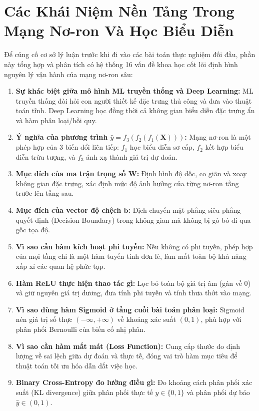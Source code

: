 \documentclass[12pt,a4paper]{report}
\begin{document}
\section{Các Khái Niệm Nền Tảng Trong Mạng Nơ-ron Và Học Biểu Diễn}
Để củng cố cơ sở lý luận trước khi đi vào các bài toán thực nghiệm đối đầu, phần này tổng hợp và phân tích có hệ thống 16 vấn đề khoa học cốt lõi định hình nguyên lý vận hành của mạng nơ-ron sâu:
\begin{enumerate}[label=\textbf{\arabic*.}]
    \item \textbf{Sự khác biệt giữa mô hình ML truyền thống và Deep Learning:} ML truyền thống đòi hỏi con người thiết kế đặc trưng thủ công và đưa vào thuật toán tĩnh. Deep Learning học đồng thời cả không gian biểu diễn đặc trưng ẩn và hàm phân loại/hồi quy.
    \item \textbf{Ý nghĩa của phương trình $\hat{y} = f_3(f_2(f_1(\mathbf{X})))$:} Mạng nơ-ron là một phép hợp của 3 biến đổi liên tiếp: $f_1$ học biểu diễn sơ cấp, $f_2$ kết hợp biểu diễn trừu tượng, và $f_3$ ánh xạ thành giá trị dự đoán.
    \item \textbf{Mục đích của ma trận trọng số $\mathbf{W}$:} Định hình độ dốc, co giãn và xoay không gian đặc trưng, xác định mức độ ảnh hưởng của từng nơ-ron tầng trước lên tầng sau.
    \item \textbf{Mục đích của vector độ chệch $\mathbf{b}$:} Dịch chuyển mặt phẳng siêu phẳng quyết định (Decision Boundary) trong không gian mà không bị gò bó đi qua gốc tọa độ.
    \item \textbf{Vì sao cần hàm kích hoạt phi tuyến:} Nếu không có phi tuyến, phép hợp của mọi tầng chỉ là một hàm tuyến tính đơn lẻ, làm mất toàn bộ khả năng xấp xỉ các quan hệ phức tạp.
    \item \textbf{Hàm ReLU thực hiện thao tác gì:} Lọc bỏ toàn bộ giá trị âm (gán về 0) và giữ nguyên giá trị dương, đưa tính phi tuyến và tính thưa thớt vào mạng.
    \item \textbf{Vì sao dùng hàm Sigmoid ở tầng cuối bài toán phân loại:} Sigmoid nén giá trị số thực $(-\infty, +\infty)$ về khoảng xác suất $(0, 1)$, phù hợp với phân phối Bernoulli của biến cố nhị phân.
    \item \textbf{Vì sao cần hàm mất mát (Loss Function):} Cung cấp thước đo định lượng về sai lệch giữa dự đoán và thực tế, đóng vai trò hàm mục tiêu để thuật toán tối ưu hóa dẫn dắt việc học.
    \item \textbf{Binary Cross-Entropy đo lường điều gì:} Đo khoảng cách phân phối xác suất (KL divergence) giữa phân phối thực tế $y \in \{0, 1\}$ và phân phối dự báo $\hat{y} \in (0, 1)$.

\end{enumerate}
\end{document}
